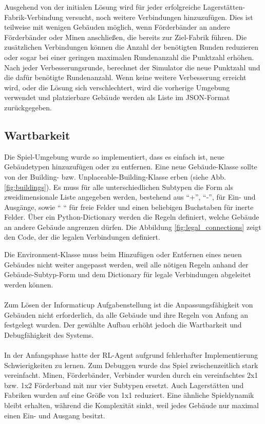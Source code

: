 Ausgehend von der initialen Lösung wird für jeder erfolgreiche Lagerstätten-Fabrik-Verbindung versucht, noch weitere Verbindungen hinzuzufügen. Dies ist teilweise mit wenigen Gebäuden möglich, wenn Förderbänder an andere Förderbänder oder Minen anschließen, die bereits zur Ziel-Fabrik führen. Die zusätzlichen Verbindungen können die Anzahl der benötigten Runden reduzieren oder sogar bei einer geringen maximalen Rundenanzahl die Punktzahl erhöhen. 
Nach jeder Verbesserungsrunde, berechnet der Simulator die neue Punktzahl und die dafür benötigte Rundenanzahl. Wenn keine weitere Verbesserung erreicht wird, oder die Lösung sich verschlechtert, wird die vorherige Umgebung verwendet und platzierbare Gebäude werden als Liste im JSON-Format zurückgegeben.

\subsection{Wartbarkeit}
Die Spiel-Umgebung wurde so implementiert, dass es einfach ist, neue Gebäudetypen hinzuzufügen oder zu entfernen. Eine neue Gebäude-Klasse sollte von der Building- bzw. Unplaceable-Building-Klasse erben (siehe Abb. \ref{fig:buildings}). Es muss für alle unterschiedlichen Subtypen die Form als zweidimensionale Liste angegeben werden, bestehend aus “+”, “-”, für Ein- und Ausgänge, sowie “ “ für freie Felder und einen beliebigen Buchstaben für inerte Felder. 
Über ein Python-Dictionary werden die Regeln definiert, welche Gebäude an andere Gebäude angrenzen dürfen. 
Die Abbildung \ref{fig:legal_connections} zeigt den Code, der die legalen Verbindungen definiert.

Die Environment-Klasse muss beim Hinzufügen oder Entfernen eines neuen Gebäudes nicht weiter angepasst werden, weil alle nötigen Regeln anhand der Gebäude-Subtyp-Form und dem Dictionary für legale Verbindungen abgeleitet werden können.
\\\\
Zum Lösen der Informaticup Aufgabenstellung ist die Anpassungsfähigkeit von Gebäuden nicht erforderlich, da alle Gebäude und ihre Regeln von Anfang an festgelegt wurden. 
Der gewählte Aufbau erhöht jedoch die Wartbarkeit und Debugfähigkeit des Systems. 
\\\\
In der Anfangsphase hatte der RL-Agent aufgrund fehlerhafter Implementierung Schwierigkeiten zu lernen. Zum Debuggen wurde das Spiel zwischenzeitlich stark vereinfacht. Minen, Förderbänder, Verbinder wurden durch ein vereinfachtes 2x1 bzw. 1x2 Förderband mit nur vier Subtypen ersetzt. Auch Lagerstätten und Fabriken wurden auf eine Größe von 1x1 reduziert. Eine ähnliche Spieldynamik bleibt erhalten, während die Komplexität sinkt, weil jedes Gebäude nur maximal einen Ein- und Ausgang besitzt. 




